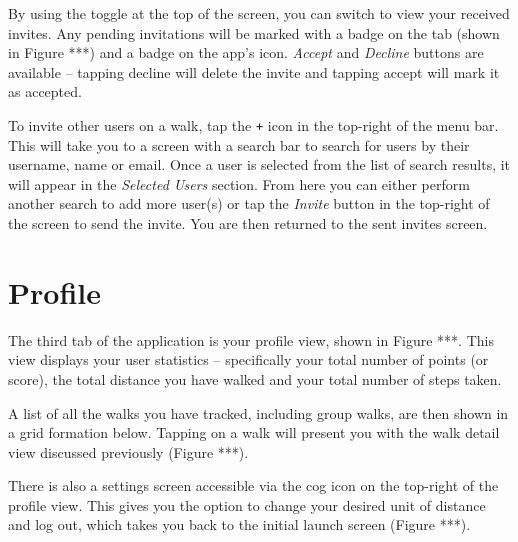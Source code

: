 By using the toggle at the top of the screen, you can switch to view your received invites. Any pending invitations will be marked with a badge on the tab (shown in Figure ***) and a badge on the app's icon. \textit{Accept} and \textit{Decline} buttons are available -- tapping decline will delete the invite and tapping accept will mark it as accepted.

To invite other users on a walk, tap the \texttt{+} icon in the top-right of the menu bar. This will take you to a screen with a search bar to search for users by their username, name or email. Once a user is selected from the list of search results, it will appear in the \textit{Selected Users} section. From here you can either perform another search to add more user(s) or tap the \textit{Invite} button in the top-right of the screen to send the invite. You are then returned to the sent invites screen.

\section{Profile}

The third tab of the application is your profile view, shown in Figure ***. This view displays your user statistics -- specifically your total number of points (or score), the total distance you have walked and your total number of steps taken.

A list of all the walks you have tracked, including group walks, are then shown in a grid formation below. Tapping on a walk will present you with the walk detail view discussed previously (Figure ***).

There is also a settings screen accessible via the cog icon on the top-right of the profile view. This gives you the option to change your desired unit of distance and log out, which takes you back to the initial launch screen (Figure ***).



